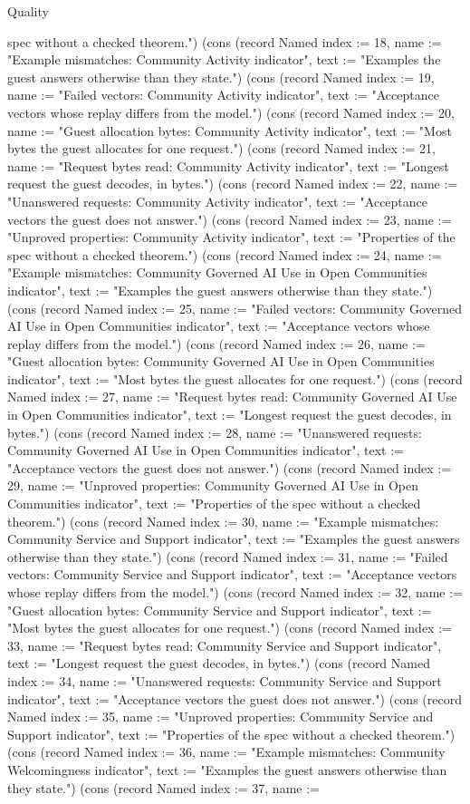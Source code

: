 \begin{lexlean}{Quality}
\begin{semanticmodule}
{spec without a checked theorem."}) (cons (record Named {index := 18, name := "Example mismatches: Community Activity indicator", text := "Examples the guest answers otherwise than they state."}) (cons (record Named {index := 19, name := "Failed vectors: Community Activity indicator", text := "Acceptance vectors whose replay differs from the model."}) (cons (record Named {index := 20, name := "Guest allocation bytes: Community Activity indicator", text := "Most bytes the guest allocates for one request."}) (cons (record Named {index := 21, name := "Request bytes read: Community Activity indicator", text := "Longest request the guest decodes, in bytes."}) (cons (record Named {index := 22, name := "Unanswered requests: Community Activity indicator", text := "Acceptance vectors the guest does not answer."}) (cons (record Named {index := 23, name := "Unproved properties: Community Activity indicator", text := "Properties of the spec without a checked theorem."}) (cons (record Named {index := 24, name := "Example mismatches: Community Governed AI Use in Open Communities indicator", text := "Examples the guest answers otherwise than they state."}) (cons (record Named {index := 25, name := "Failed vectors: Community Governed AI Use in Open Communities indicator", text := "Acceptance vectors whose replay differs from the model."}) (cons (record Named {index := 26, name := "Guest allocation bytes: Community Governed AI Use in Open Communities indicator", text := "Most bytes the guest allocates for one request."}) (cons (record Named {index := 27, name := "Request bytes read: Community Governed AI Use in Open Communities indicator", text := "Longest request the guest decodes, in bytes."}) (cons (record Named {index := 28, name := "Unanswered requests: Community Governed AI Use in Open Communities indicator", text := "Acceptance vectors the guest does not answer."}) (cons (record Named {index := 29, name := "Unproved properties: Community Governed AI Use in Open Communities indicator", text := "Properties of the spec without a checked theorem."}) (cons (record Named {index := 30, name := "Example mismatches: Community Service and Support indicator", text := "Examples the guest answers otherwise than they state."}) (cons (record Named {index := 31, name := "Failed vectors: Community Service and Support indicator", text := "Acceptance vectors whose replay differs from the model."}) (cons (record Named {index := 32, name := "Guest allocation bytes: Community Service and Support indicator", text := "Most bytes the guest allocates for one request."}) (cons (record Named {index := 33, name := "Request bytes read: Community Service and Support indicator", text := "Longest request the guest decodes, in bytes."}) (cons (record Named {index := 34, name := "Unanswered requests: Community Service and Support indicator", text := "Acceptance vectors the guest does not answer."}) (cons (record Named {index := 35, name := "Unproved properties: Community Service and Support indicator", text := "Properties of the spec without a checked theorem."}) (cons (record Named {index := 36, name := "Example mismatches: Community Welcomingness indicator", text := "Examples the guest answers otherwise than they state."}) (cons (record Named {index := 37, name := }
\end{semanticmodule}
\end{lexlean}

